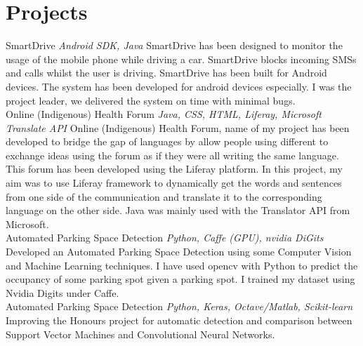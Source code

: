 \documentclass[letterpaper]{moderncv}        %
\begin{document}
\section{Projects}
\cventry
{}
{SmartDrive}
{}
{\textit{Android SDK, Java}}
{}
{SmartDrive has been designed to monitor the usage of the mobile phone while driving a car. SmartDrive blocks incoming SMSs and calls whilst the user is driving. SmartDrive has been built for Android devices. The system has been developed for android devices especially. I was the project leader, we delivered the system on time with minimal bugs.\\}
	\vspace{1mm}
	\cventry
	{}
	{Online (Indigenous) Health Forum}
	{}
	{\textit{Java, CSS, HTML, Liferay, Microsoft Translate API}}
	{}
	{Online (Indigenous) Health Forum, name of my project has been developed to bridge the gap of languages by allow people using different to exchange ideas using the forum as if they were all writing the same language. This forum has been developed using the Liferay platform. In this project, my aim was to use Liferay framework to dynamically get the words and sentences from one side of the communication and translate it to the corresponding language on the other side. Java was mainly used with the Translator API from Microsoft.\\}
		\vspace{1mm}
		\cventry
		{}
		{Automated Parking Space Detection}
		{}
		{\textit{Python, Caffe (GPU), nvidia DiGits}}
		{}
		{Developed an Automated Parking Space Detection using some Computer Vision and Machine Learning techniques. I have used opencv with Python to predict the occupancy of some parking spot given a parking spot. I trained my dataset using Nvidia Digits under Caffe.\\}
			\vspace{1mm}
			\cventry
			{}
			{Automated Parking Space Detection}
			{}
			{\textit{Python, Keras, Octave/Matlab, Scikit-learn}}
			{}
			{Improving the Honours project for automatic detection and comparison between Support Vector Machines and Convolutional Neural Networks.\\}
				\vspace{1mm}
\end{document}
